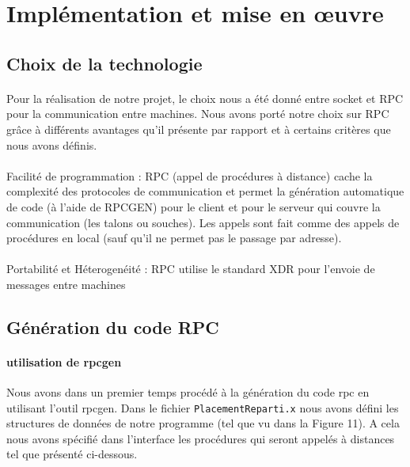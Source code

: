 
\lstset{language=C} %

\section{Implémentation et mise en œuvre}
 
  \subsection{Choix de la technologie}
    \paragraph{}
     Pour la réalisation de notre projet, le choix nous a été donné entre 
     socket et RPC pour la communication entre machines. 
     Nous avons porté notre choix sur RPC grâce à différents  avantages 
     qu'il présente par rapport et à certains critères que nous avons définis. 

     \paragraph{}
     \noindent Facilité de programmation :
     RPC (appel de procédures à distance) cache la complexité des protocoles 
     de communication et permet la génération automatique de code (à l'aide
     de RPCGEN) pour le client et pour le serveur qui couvre la communication 
     (les talons ou souches). Les appels sont fait comme des appels de procédures
     en local (sauf qu'il ne permet pas le passage par adresse).
     
     \paragraph{}
     \noindent Portabilité et Héterogenéité :
     RPC utilise le standard XDR pour l'envoie de messages entre machines
     
 \subsection{Génération du code RPC}
    \paragraph{utilisation de rpcgen}
    Nous avons dans un premier temps procédé à la génération du code rpc
    en utilisant l'outil rpcgen. Dans le fichier \verb"PlacementReparti.x" nous
    avons défini les structures de données de notre programme (tel que
    vu dans la Figure 11). A cela nous avons spécifié dans l'interface
    les procédures qui seront appelés à distances  tel que présenté
    ci-dessous.
    
